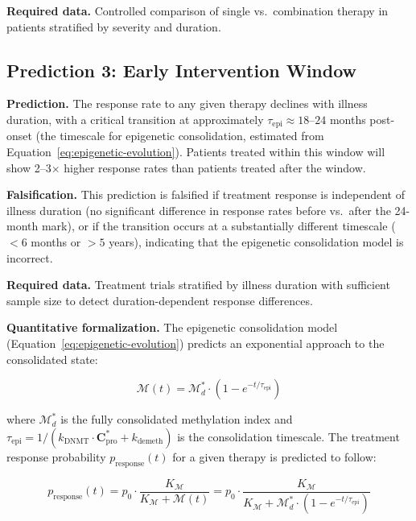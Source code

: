 \textbf{Required data.} Controlled comparison of single vs.\ combination therapy in patients stratified by severity and duration.

\subsection{Prediction 3: Early Intervention Window}
\label{sec:prediction-early}

\textbf{Prediction.} The response rate to any given therapy declines with illness duration, with a critical transition at approximately $\tau_{\text{epi}} \approx 18$--$24$ months post-onset (the timescale for epigenetic consolidation, estimated from Equation~\ref{eq:epigenetic-evolution}). Patients treated within this window will show 2--3$\times$ higher response rates than patients treated after the window.

\textbf{Falsification.} This prediction is falsified if treatment response is independent of illness duration (no significant difference in response rates before vs.\ after the 24-month mark), or if the transition occurs at a substantially different timescale ($< 6$ months or $> 5$ years), indicating that the epigenetic consolidation model is incorrect.

\textbf{Required data.} Treatment trials stratified by illness duration with sufficient sample size to detect duration-dependent response differences.

\textbf{Quantitative formalization.} The epigenetic consolidation model (Equation~\ref{eq:epigenetic-evolution}) predicts an exponential approach to the consolidated state:

\begin{equation}
\label{eq:consolidation-curve}
\mathcal{M}(t) = \mathcal{M}_d^* \cdot (1 - e^{-t/\tau_{\text{epi}}})
\end{equation}

where $\mathcal{M}_d^*$ is the fully consolidated methylation index and $\tau_{\text{epi}} = 1/(k_{\text{DNMT}} \cdot \boldsymbol{C}_{\text{pro}}^* + k_{\text{demeth}})$ is the consolidation timescale. The treatment response probability $p_{\text{response}}(t)$ for a given therapy is predicted to follow:

\begin{equation}
\label{eq:response-decay}
p_{\text{response}}(t) = p_0 \cdot \frac{K_{\mathcal{M}}}{K_{\mathcal{M}} + \mathcal{M}(t)} = p_0 \cdot \frac{K_{\mathcal{M}}}{K_{\mathcal{M}} + \mathcal{M}_d^* \cdot (1 - e^{-t/\tau_{\text{epi}}})}
\end{equation}

